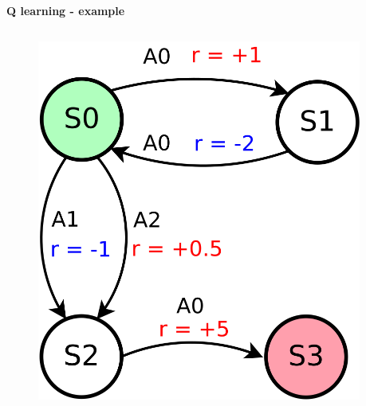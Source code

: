 \documentclass[xcolor=dvipsnames]{beamer}
\begin{document}
\begin{frame}{\bf Q learning - example}

\begin{columns}
    \begin{column}{0.5\textwidth}

        \begin{figure}
          \includegraphics[scale=0.2]{../../diagrams/q_learning_example_01.png}
        \end{figure}

    \end{column}
    \begin{column}{0.5\textwidth}


\end{column}
\end{columns}
\end{frame}
\end{document}
